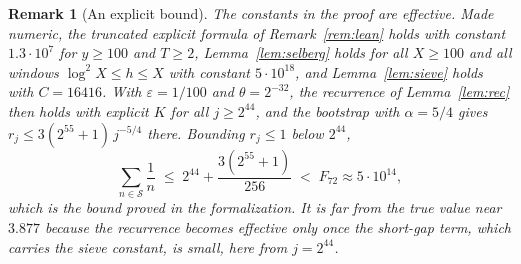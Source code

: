 \documentclass[11pt]{amsart}
\newtheorem{remark}[lemma]{Remark}
\newcommand{\Sset}{\mathcal{S}}
\begin{document}
\begin{remark}[An explicit bound]
\label{rem:explicit}
The constants in the proof are effective. Made numeric, the truncated
explicit formula of Remark~\ref{rem:lean} holds with constant $1.3 \cdot
10^7$ for $y \ge 100$ and $T \ge 2$, Lemma~\ref{lem:selberg} holds for all
$X \ge 100$ and all windows $\log^2 X \le h \le X$ with constant $5 \cdot
10^{18}$, and Lemma~\ref{lem:sieve} holds with $C = 16416$. With
$\varepsilon = 1/100$ and $\theta = 2^{-32}$, the recurrence of
Lemma~\ref{lem:rec} then holds with explicit $K$ for all $j \ge 2^{44}$,
and the bootstrap with $\alpha = 5/4$ gives $r_j \le 3(2^{55} + 1)\,
j^{-5/4}$ there. Bounding $r_j \le 1$ below $2^{44}$,
\[
\sum_{n \in \Sset} \frac{1}{n} \;\le\; 2^{44} + \frac{3(2^{55}+1)}{256}
\;<\; F_{72} \approx 5 \cdot 10^{14},
\]
which is the bound proved in the formalization. It is far
from the true value near $3.877$ because the recurrence becomes effective
only once the short-gap term, which carries the sieve constant, is small,
here from $j = 2^{44}$.
\end{remark}
\end{document}
